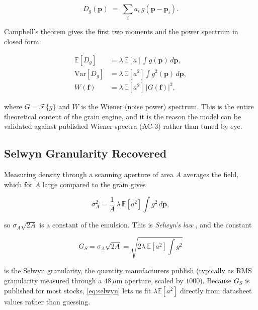 \begin{equation}
D_g(\mathbf{p}) \;=\; \sum_i a_i\, g\!\left(\mathbf{p} - \mathbf{p}_i\right).
\label{eq:shotnoise}
\end{equation}

Campbell's theorem \cite{campbell1909} gives the first two moments and the power
spectrum in closed form:

\begin{align}
\mathbb{E}[D_g] &= \lambda\,\mathbb{E}[a] \int g(\mathbf{p})\, d\mathbf{p},
\label{eq:campbell-mean}\\
\mathrm{Var}[D_g] &= \lambda\,\mathbb{E}[a^2] \int g^2(\mathbf{p})\, d\mathbf{p},
\label{eq:campbell-var}\\
W(\mathbf{f}) &= \lambda\,\mathbb{E}[a^2]\, \left|G(\mathbf{f})\right|^2,
\label{eq:wiener}
\end{align}

where $G = \mathcal{F}\{g\}$ and $W$ is the Wiener (noise power) spectrum. This
is the entire theoretical content of the grain engine, and it is the reason the
model can be validated against published Wiener spectra (AC-3) rather than
tuned by eye.

\subsection{Selwyn Granularity Recovered}

Measuring density through a scanning aperture of area $A$ averages the field,
which for $A$ large compared to the grain gives

\begin{equation}
\sigma_A^2 = \frac{1}{A}\,\lambda\,\mathbb{E}[a^2] \int g^2\, d\mathbf{p},
\end{equation}

so $\sigma_A \sqrt{2A}$ is a constant of the emulsion. This is
\emph{Selwyn's law} \cite{selwyn1935}, and the constant

\begin{equation}
G_S = \sigma_A\sqrt{2A} = \sqrt{2\lambda\,\mathbb{E}[a^2]\textstyle\int g^2}
\label{eq:selwyn}
\end{equation}

is the Selwyn granularity, the quantity manufacturers publish (typically as RMS
granularity measured through a $48\,\mu$m aperture, scaled by $1000$). Because
$G_S$ is published for most stocks, \eqref{eq:selwyn} lets us fit
$\lambda\mathbb{E}[a^2]$ directly from datasheet values rather than guessing.

